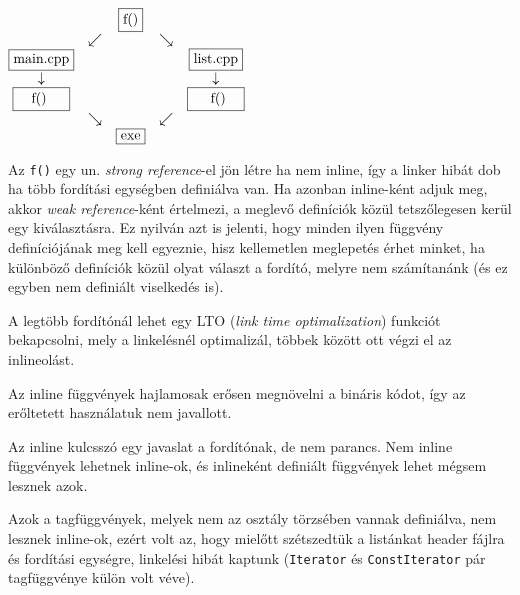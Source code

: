 \documentclass[a4paper,11.5pt]{article}
\begin{document}
	\begin{center}
		$\begin{matrix}
		&&\fbox{f()}&&\\
		&\swarrow&&\searrow&\\
		\fbox{\text{main.cpp}}&&&&\fbox{list.cpp}\\
		\downarrow&&&&\downarrow\\
		\fbox{\quad   f() \quad }&&&&\fbox{ \quad f()\quad  }\\
		&\searrow&&\swarrow&\\
		&&\fbox{exe}&&
		\end{matrix}$
	\end{center}
	Az \texttt{f()} egy un. \textit{strong reference}-el jön létre ha nem inline, így a linker hibát dob ha több fordítási egységben definiálva van. Ha azonban inline-ként adjuk meg, akkor  \textit{weak reference}-ként értelmezi, a meglevő definíciók közül tetszőlegesen kerül egy kiválasztásra. Ez nyilván azt is jelenti, hogy minden ilyen függvény definíciójának meg kell egyeznie, hisz kellemetlen meglepetés érhet minket, ha különböző definíciók közül olyat választ a fordító, melyre nem számítanánk (és ez egyben nem definiált viselkedés is).
	\begin{note}
		A legtöbb fordítónál lehet egy LTO (\textit{link time optimalization}) funkciót bekapcsolni, mely a linkelésnél optimalizál, többek között ott végzi el az inlineolást.
	\end{note}
	\begin{note}
		Az inline függvények hajlamosak erősen megnövelni a bináris kódot, így az erőltetett használatuk nem javallott.
	\end{note}
	\begin{note}
		Az inline kulcsszó egy javaslat a fordítónak, de nem parancs. Nem inline függvények lehetnek inline-ok, és inlineként definiált függvények lehet mégsem lesznek azok.
	\end{note}
	Azok a tagfüggvények, melyek nem az osztály törzsében vannak definiálva, nem lesznek inline-ok, ezért volt az, hogy mielőtt szétszedtük a listánkat header fájlra és fordítási egységre, linkelési hibát kaptunk (\texttt{Iterator} és \texttt{ConstIterator} pár tagfüggvénye külön volt véve).
\end{document}
